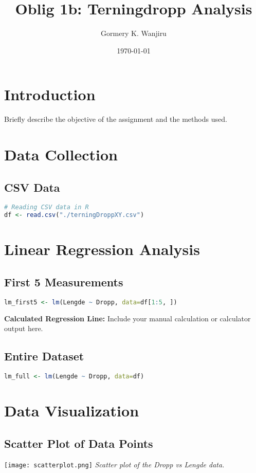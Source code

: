 \documentclass{article}
\title{Oblig 1b: Terningdropp Analysis}
\author{Gormery K. Wanjiru}
\date{\today}
\begin{document}
\maketitle

\section{Introduction}
Briefly describe the objective of the assignment and the methods used.

\section{Data Collection}
\subsection{CSV Data}
\begin{lstlisting}[language=R]
# Reading CSV data in R
df <- read.csv("./terningDroppXY.csv")
\end{lstlisting}

\section{Linear Regression Analysis}
\subsection{First 5 Measurements}
\begin{lstlisting}[language=R]
lm_first5 <- lm(Lengde ~ Dropp, data=df[1:5, ])
\end{lstlisting}
\textbf{Calculated Regression Line:} Include your manual calculation or calculator output here.

\subsection{Entire Dataset}
\begin{lstlisting}[language=R]
lm_full <- lm(Lengde ~ Dropp, data=df)
\end{lstlisting}

\section{Data Visualization}
\subsection{Scatter Plot of Data Points}
\texttt{[image: scatterplot.png]}
\textit{Scatter plot of the Dropp vs Lengde data.}
\end{document}
